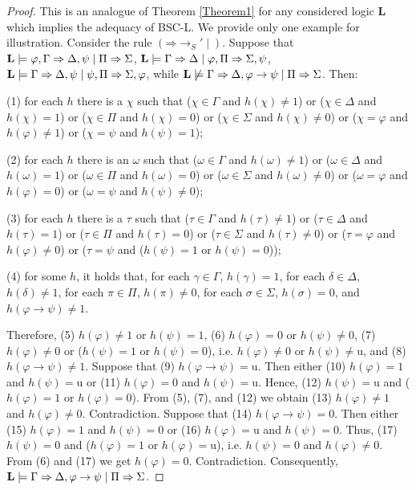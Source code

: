 \documentclass[10pt,a4paper]{article}
\theoremstyle{definition}
\newcommand{\3}{\vspace{.3in}}
\newcommand{\2}{\vspace{.2in}}
\newcommand{\1}{\vspace{.1in}}
\newcommand{\5}{\vspace{.05in}}
\begin{document}
\begin{proof}
This is an analogue of Theorem \ref{Theorem1} for any considered logic {\bf L} which implies the adequacy of BSC-L. We provide only one example for illustration. Consider the rule $(\mathord{\Rightarrow}\mathord{\rightarrow_S'\mid})$. Suppose that $ {\bf L}\models \varphi,\Gamma\Rightarrow\Delta,\psi\mid\Pi\Rightarrow\Sigma$, $ {\bf L}\models \Gamma\Rightarrow\Delta\mid\varphi,\Pi\Rightarrow\Sigma,\psi$, $ {\bf L}\models \Gamma\Rightarrow\Delta,\psi\mid\psi,\Pi\Rightarrow\Sigma,\varphi$, while $ {\bf L}\not\models \Gamma\Rightarrow\Delta,\varphi\rightarrow\psi\mid\Pi\Rightarrow\Sigma$. Then: 

(1) for each $ h $ there is a $ \chi $ such that ($ \chi\in\Gamma $ and $ h(\chi)\not=1 $) or ($ \chi\in\Delta $ and $ h(\chi)=1 $) or ($ \chi\in\Pi $ and $ h(\chi)=0$) or ($ \chi\in\Sigma $ and $ h(\chi)\not=0 $) or ($ \chi=\varphi $ and $ h(\varphi)\not=1 $) or ($ \chi=\psi $ and $ h(\psi)=1 $); 

(2) for each $ h $ there is an $ \omega $ such that ($ \omega\in\Gamma $ and $ h(\omega)\not=1 $) or ($ \omega\in\Delta $ and $ h(\omega)=1 $) or ($ \omega\in\Pi $ and $ h(\omega)=0$) or ($ \omega\in\Sigma $ and $ h(\omega)\not=0 $) or ($ \omega=\varphi $ and $ h(\varphi)=0 $) or ($ \omega=\psi $ and $ h(\psi)\not=0 $); 

(3) for each $ h $ there is a $ \tau $ such that ($ \tau\in\Gamma $ and $ h(\tau)\not=1 $) or ($ \tau\in\Delta $ and $ h(\tau)=1 $) or ($ \tau\in\Pi $ and $ h(\tau)=0$) or ($ \tau\in\Sigma $ and $ h(\tau)\not=0 $) or ($ \tau=\varphi $ and $ h(\varphi)\not=0 $) or ($ \tau=\psi $ and ($ h(\psi)=1 $ or $ h(\psi)=0 $)); 

(4) for some $ h $, it holds that, for each $ \gamma\in\Gamma $, $h(\gamma)=1$, for each $ \delta\in\Delta $, $ h(\delta)\not=1 $, for each $ \pi\in\Pi $, $ h(\pi)\not=0 $, for each $ \sigma\in\Sigma $, $ h(\sigma)=0 $, and $ h(\varphi\rightarrow\psi)\not=1 $.

Therefore, (5) $ h(\varphi)\not=1 $ or $ h(\psi)=1 $, (6) $ h(\varphi)=0 $ or $ h(\psi)\not=0 $, (7) $ h(\varphi)\not=0 $ or ($ h(\psi)=1 $ or $ h(\psi)=0 $), i.e. $ h(\varphi)\not=0 $ or $ h(\psi)\not=\mathrm{u} $, and (8) $ h(\varphi\rightarrow\psi)\not=1 $. Suppose that (9) $ h(\varphi\rightarrow\psi)=\mathrm{u} $. Then either (10) $ h(\varphi)=1 $ and $ h(\psi)=\mathrm{u} $ or (11) $ h(\varphi)=0 $ and $ h(\psi)=\mathrm{u} $. Hence, (12) $ h(\psi)=\mathrm{u} $ and ($ h(\varphi)=1 $ or $ h(\varphi)=0 $). From (5), (7), and (12) we obtain (13) $ h(\varphi)\not=1 $ and $ h(\varphi)\not=0 $. Contradiction. Suppose that (14) $ h(\varphi\rightarrow\psi)=0$. Then either (15) $ h(\varphi)=1 $ and $ h(\psi)=0 $ or (16) $ h(\varphi)=\mathrm{u} $ and $ h(\psi)=0 $. Thus, (17) $ h(\psi)=0 $ and ($ h(\varphi)=1 $ or $ h(\varphi)=\mathrm{u} $), i.e. $ h(\psi)=0 $ and $ h(\varphi)\not=0 $. From (6) and (17) we get $ h(\varphi)=0 $. Contradiction. Consequently, $ {\bf L}\models \Gamma\Rightarrow\Delta,\varphi\rightarrow\psi\mid\Pi\Rightarrow\Sigma$.


\end{proof}
\end{document}
